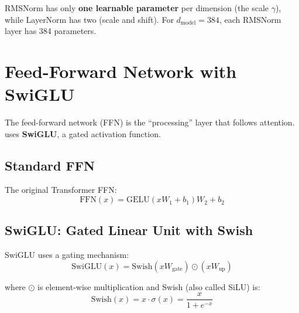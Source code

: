 \begin{keypoint}
RMSNorm has only \textbf{one learnable parameter} per dimension (the scale $\gamma$), while LayerNorm has two (scale and shift). For $d_{\text{model}} = 384$, each RMSNorm layer has 384 parameters.
\end{keypoint}

\section{Feed-Forward Network with SwiGLU}

The feed-forward network (FFN) is the ``processing'' layer that follows attention. \TryLM uses \textbf{SwiGLU}, a gated activation function.

\subsection{Standard FFN}

The original Transformer FFN:
\begin{equation}
\text{FFN}(x) = \text{GELU}(xW_1 + b_1)W_2 + b_2
\end{equation}

\subsection{SwiGLU: Gated Linear Unit with Swish}

SwiGLU uses a gating mechanism:
\begin{equation}
\text{SwiGLU}(x) = \text{Swish}(xW_{\text{gate}}) \odot (xW_{\text{up}})
\end{equation}

where $\odot$ is element-wise multiplication and Swish (also called SiLU) is:
\begin{equation}
\text{Swish}(x) = x \cdot \sigma(x) = \frac{x}{1 + e^{-x}}
\end{equation}

